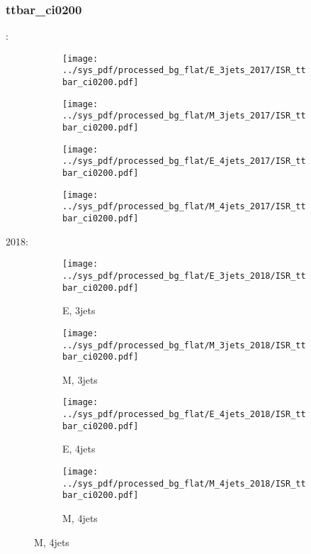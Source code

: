 \documentclass{beamer}
\begin{document}
\begin{frame}
\frametitle{ttbar_ci0200}
\fontsize{5}{1}:
\begin{figure}
\centering
\begin{subfigure}[b]{0.24\textwidth}
\texttt{[image: ../sys\_pdf/processed\_bg\_flat/E\_3jets\_2017/ISR\_ttbar\_ci0200.pdf]}
\end{subfigure}
\begin{subfigure}[b]{0.24\textwidth}
\texttt{[image: ../sys\_pdf/processed\_bg\_flat/M\_3jets\_2017/ISR\_ttbar\_ci0200.pdf]}
\end{subfigure}
\begin{subfigure}[b]{0.24\textwidth}
\texttt{[image: ../sys\_pdf/processed\_bg\_flat/E\_4jets\_2017/ISR\_ttbar\_ci0200.pdf]}
\end{subfigure}
\begin{subfigure}[b]{0.24\textwidth}
\texttt{[image: ../sys\_pdf/processed\_bg\_flat/M\_4jets\_2017/ISR\_ttbar\_ci0200.pdf]}
\end{subfigure}
\end{figure}
2018:
\begin{figure}
\centering
\begin{subfigure}[b]{0.24\textwidth}
\texttt{[image: ../sys\_pdf/processed\_bg\_flat/E\_3jets\_2018/ISR\_ttbar\_ci0200.pdf]}
\captionsetup{font=tiny}
\caption{E, 3jets}
\end{subfigure}
\begin{subfigure}[b]{0.24\textwidth}
\texttt{[image: ../sys\_pdf/processed\_bg\_flat/M\_3jets\_2018/ISR\_ttbar\_ci0200.pdf]}
\captionsetup{font=tiny}
\caption{M, 3jets}
\end{subfigure}
\begin{subfigure}[b]{0.24\textwidth}
\texttt{[image: ../sys\_pdf/processed\_bg\_flat/E\_4jets\_2018/ISR\_ttbar\_ci0200.pdf]}
\captionsetup{font=tiny}
\caption{E, 4jets}
\end{subfigure}
\begin{subfigure}[b]{0.24\textwidth}
\texttt{[image: ../sys\_pdf/processed\_bg\_flat/M\_4jets\_2018/ISR\_ttbar\_ci0200.pdf]}
\captionsetup{font=tiny}
\caption{M, 4jets}
\end{subfigure}
\end{figure}
\end{frame}
\end{document}
